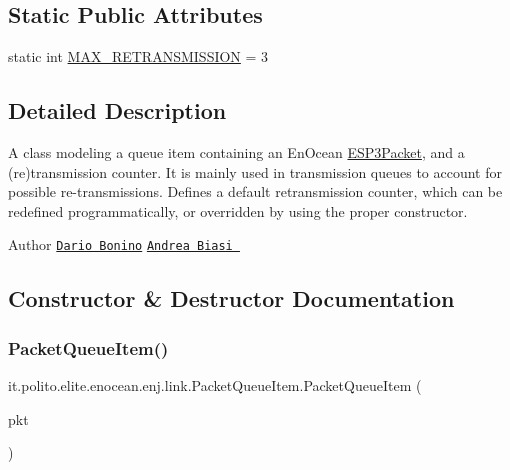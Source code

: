 \subsection*{Static Public Attributes}
\begin{DoxyCompactItemize}
\item 
static int \hyperlink{classit_1_1polito_1_1elite_1_1enocean_1_1enj_1_1link_1_1_packet_queue_item_ad213f916f09ec73b7165e227e9674100}{M\+A\+X\+\_\+\+R\+E\+T\+R\+A\+N\+S\+M\+I\+S\+S\+I\+ON} = 3
\end{DoxyCompactItemize}


\subsection{Detailed Description}
A class modeling a queue item containing an En\+Ocean \hyperlink{}{E\+S\+P3\+Packet}, and a (re)transmission counter. It is mainly used in transmission queues to account for possible re-\/transmissions. Defines a default retransmission counter, which can be redefined programmatically, or overridden by using the proper constructor.

\begin{DoxyAuthor}{Author}
\href{mailto:dario.bonino@gmail.com}{\tt Dario Bonino}  \href{mailto:biasiandrea04@gmail.com}{\tt Andrea Biasi } 
\end{DoxyAuthor}


\subsection{Constructor \& Destructor Documentation}
\hypertarget{classit_1_1polito_1_1elite_1_1enocean_1_1enj_1_1link_1_1_packet_queue_item_a869936e05900f0255113b643e98d94cc}{}\label{classit_1_1polito_1_1elite_1_1enocean_1_1enj_1_1link_1_1_packet_queue_item_a869936e05900f0255113b643e98d94cc} 
\subsubsection{\texorpdfstring{Packet\+Queue\+Item()}{PacketQueueItem()}}
{\footnotesize\ttfamily it.\+polito.\+elite.\+enocean.\+enj.\+link.\+Packet\+Queue\+Item.\+Packet\+Queue\+Item (\begin{DoxyParamCaption}\item[{\hyperlink{classit_1_1polito_1_1elite_1_1enocean_1_1protocol_1_1serial_1_1v3_1_1network_1_1packet_1_1_e_s_p3_packet}{E\+S\+P3\+Packet}}]{pkt }\end{DoxyParamCaption})}

